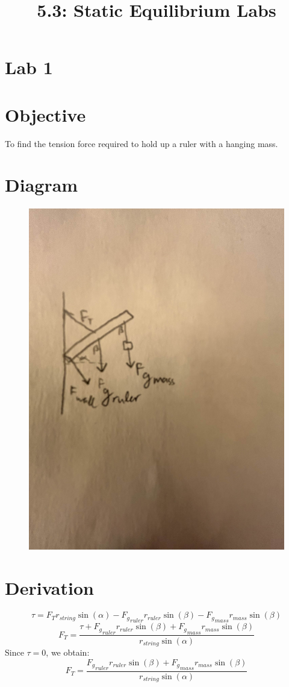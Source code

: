 \documentclass{article}
\title{5.3: Static Equilibrium Labs}
\begin{document}
\section{Lab 1}
\section*{Objective}
To find the tension force required to hold up a ruler with a hanging mass.
\section*{Diagram}
\begin{figure}[H]
    \centering
    \includegraphics[height=15cm]{Lab 5.3.1.jpg}
\end{figure}
\section*{Derivation}
\[\tau = F_Tr_{string}\sin(\alpha) - {F_g}_{ruler}r_{ruler}\sin(\beta) - {F_g}_{mass}r_{mass}\sin(\beta)\]
\[F_T = \frac{\tau + {F_g}_{ruler}r_{ruler}\sin(\beta) + {F_g}_{mass}r_{mass}\sin(\beta)}{r_{string}\sin(\alpha)}\]
Since $\tau = 0$, we obtain:
\[F_T = \frac{{F_g}_{ruler}r_{ruler}\sin(\beta) + {F_g}_{mass}r_{mass}\sin(\beta)}{r_{string}\sin(\alpha)}\]
\end{document}
